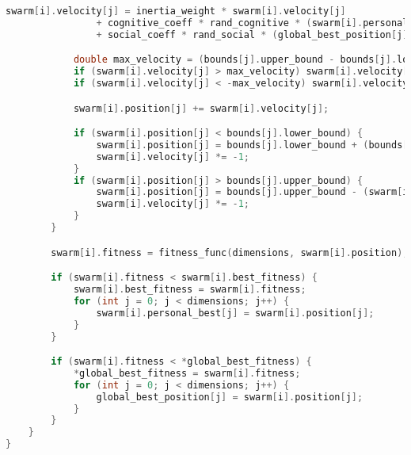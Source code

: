 \documentclass[12pt]{article}
\begin{document}
\begin{lstlisting}[language=C]
            swarm[i].velocity[j] = inertia_weight * swarm[i].velocity[j]
                + cognitive_coeff * rand_cognitive * (swarm[i].personal_best[j] - swarm[i].position[j])
                + social_coeff * rand_social * (global_best_position[j] - swarm[i].position[j]);

            double max_velocity = (bounds[j].upper_bound - bounds[j].lower_bound) * 0.2;
            if (swarm[i].velocity[j] > max_velocity) swarm[i].velocity[j] = max_velocity;
            if (swarm[i].velocity[j] < -max_velocity) swarm[i].velocity[j] = -max_velocity;

            swarm[i].position[j] += swarm[i].velocity[j];

            if (swarm[i].position[j] < bounds[j].lower_bound) {
                swarm[i].position[j] = bounds[j].lower_bound + (bounds[j].lower_bound - swarm[i].position[j]);
                swarm[i].velocity[j] *= -1;
            }
            if (swarm[i].position[j] > bounds[j].upper_bound) {
                swarm[i].position[j] = bounds[j].upper_bound - (swarm[i].position[j] - bounds[j].upper_bound);
                swarm[i].velocity[j] *= -1;
            }
        }

        swarm[i].fitness = fitness_func(dimensions, swarm[i].position);

        if (swarm[i].fitness < swarm[i].best_fitness) {
            swarm[i].best_fitness = swarm[i].fitness;
            for (int j = 0; j < dimensions; j++) {
                swarm[i].personal_best[j] = swarm[i].position[j];
            }
        }

        if (swarm[i].fitness < *global_best_fitness) {
            *global_best_fitness = swarm[i].fitness;
            for (int j = 0; j < dimensions; j++) {
                global_best_position[j] = swarm[i].position[j];
            }
        }
    }
}
\end{lstlisting}
\end{document}
